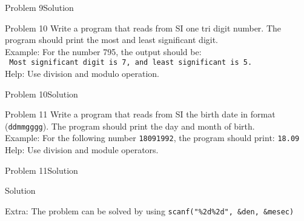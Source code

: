 \begin{frame}[fragile]{Problem 9}{Solution}
	
\end{frame}


\begin{frame}[fragile]{Problem 10}
Write a program that reads from SI one tri digit number. The program should
print the most and least significant digit.\\ 
Example: For the number 795, the output should be:\\
\texttt{	Most significant digit is 7, and least significant is 5.}\\
Help: Use division and modulo operation.
\end{frame}

\begin{frame}[fragile]{Problem 10}{Solution}

\end{frame}


\begin{frame}[fragile]{Problem 11}
Write a program that reads from SI the birth date in format (\texttt{ddmmgggg}).
The program should print the day and month of birth.\\
Example: For the following number \texttt{18091992}, the program should print:
\texttt{18.09}\\ Help: Use division and module operators.
\end{frame}

\begin{frame}[fragile]{Problem 11}{Solution}
	\begin{exampleblock}{Solution}
		
	\end{exampleblock}
	Extra: The problem can be solved by using
	\texttt{scanf("\%2d\%2d", \&den, \&mesec)}
\end{frame}
